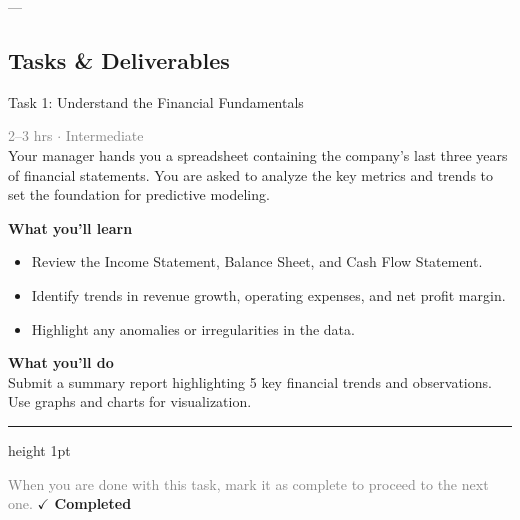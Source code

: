 \documentclass[10pt,a4paper]{article}
\begin{document}
---

\subsection*{Tasks \& Deliverables}

\begin{taskbox}{Task 1: Understand the Financial Fundamentals}

    {\small \textcolor{gray}{2--3 hrs $\cdot$ Intermediate}}\\[12pt]

      
Your manager hands you a spreadsheet containing the company’s last three years of financial statements. You are asked to analyze the key metrics and trends to set the foundation for predictive modeling.  


\vspace{8pt}
{\large \textbf{\textcolor{brandLight}{What you'll learn}}}\\[4pt]  
\begin{itemize}
    \item Review the Income Statement, Balance Sheet, and Cash Flow Statement.  
    \item Identify trends in revenue growth, operating expenses, and net profit margin.  
    \item Highlight any anomalies or irregularities in the data.  
\end{itemize}

\vspace{8pt}
{\large \textbf{\textcolor{brandLight}{What you'll do}}}\\[4pt]  
Submit a summary report highlighting 5 key financial trends and observations. Use graphs and charts for visualization.\par

    \vspace{16pt}

    \textcolor{cardBorder}{\hrule height 1pt}\vspace{8pt}

    \small \textcolor{gray}{When you are done with this task, mark it as complete to proceed to the next one.} \hfill \textbf{\textcolor{brandDark}{$\checkmark$ Completed}}

\end{taskbox}
\end{document}
